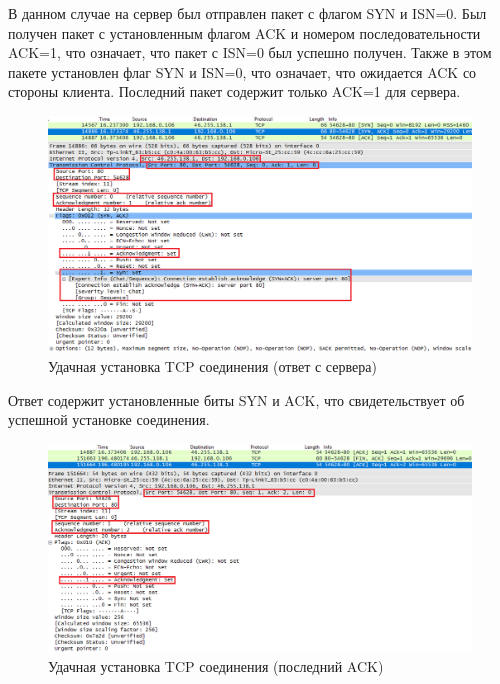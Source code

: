 \documentclass[14pt,a4paper,report]{report}
\begin{document}
В данном случае на сервер был отправлен пакет с флагом SYN и ISN=0. Был получен пакет с установленным флагом ACK и номером последовательности ACK=1, что означает, что пакет с ISN=0 был успешно получен. Также в этом пакете установлен флаг SYN и ISN=0, что означает, что ожидается ACK со стороны клиента. Последний пакет содержит только ACK=1 для сервера.

\begin{figure}[h!]
	\centering
	\includegraphics[scale = 0.62]{images/tcp2.png}
	
	\caption{Удачная установка TCP соединения (ответ с сервера)}
	\label{image:16}
\end{figure}

Ответ содержит установленные биты SYN и ACK, что свидетельствует об успешной установке соединения. 

\clearpage

\begin{figure}[h!]
	\centering
	\includegraphics[scale = 0.61]{images/tcp3.png}
	
	\caption{Удачная установка TCP соединения (последний ACK)}
	\label{image:17}
\end{figure}
\end{document}
